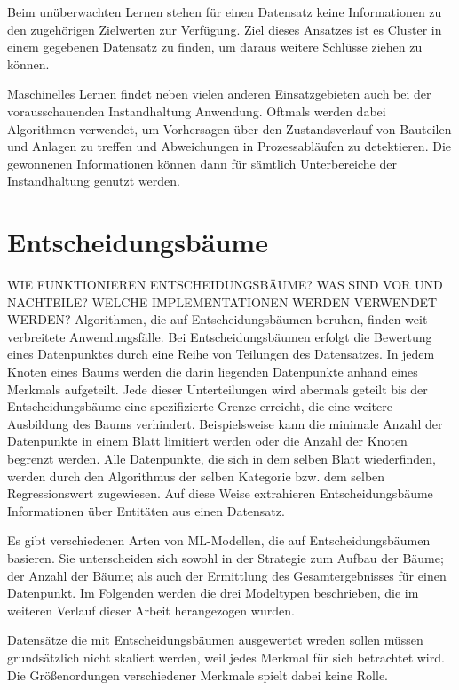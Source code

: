 Beim unüberwachten Lernen stehen für einen Datensatz keine Informationen zu den zugehörigen Zielwerten zur Verfügung. Ziel dieses Ansatzes ist es Cluster in einem gegebenen Datensatz zu finden, um daraus weitere Schlüsse ziehen zu können.


Maschinelles Lernen findet neben vielen anderen Einsatzgebieten auch bei der vorausschauenden Instandhaltung Anwendung. Oftmals werden dabei Algorithmen verwendet, um Vorhersagen über den Zustandsverlauf von Bauteilen und Anlagen zu treffen und Abweichungen in Prozessabläufen zu detektieren. Die gewonnenen Informationen können dann für sämtlich Unterbereiche der Instandhaltung genutzt werden.

\section{Entscheidungsbäume}
\label{sec:entscheidungsbaeume}
WIE FUNKTIONIEREN ENTSCHEIDUNGSBÄUME? WAS SIND VOR UND NACHTEILE? WELCHE IMPLEMENTATIONEN WERDEN VERWENDET WERDEN? 
Algorithmen, die auf Entscheidungsbäumen beruhen, finden weit verbreitete Anwendungsfälle. Bei Entscheidungsbäumen erfolgt die Bewertung eines Datenpunktes durch eine Reihe von Teilungen des Datensatzes. In jedem Knoten eines Baums werden die darin liegenden Datenpunkte anhand eines Merkmals aufgeteilt. Jede dieser Unterteilungen wird abermals geteilt bis der Entscheidungsbäume eine spezifizierte Grenze erreicht, die eine weitere Ausbildung des Baums verhindert. Beispielsweise kann die minimale Anzahl der Datenpunkte in einem Blatt limitiert werden oder die Anzahl der Knoten begrenzt werden. Alle Datenpunkte, die sich in dem selben Blatt wiederfinden, werden durch den Algorithmus der selben Kategorie bzw. dem selben Regressionswert zugewiesen.  Auf diese Weise extrahieren Entscheidungsbäume Informationen über Entitäten aus einen Datensatz.

Es gibt verschiedenen Arten von ML-Modellen, die auf Entscheidungsbäumen basieren. Sie unterscheiden sich sowohl in der Strategie zum Aufbau der Bäume; der Anzahl der Bäume; als auch der Ermittlung des Gesamtergebnisses für einen Datenpunkt. Im Folgenden werden die drei Modeltypen beschrieben, die im weiteren Verlauf dieser Arbeit herangezogen wurden.

Datensätze die mit Entscheidungsbäumen ausgewertet wreden sollen müssen grundsätzlich nicht skaliert werden, weil jedes Merkmal für sich betrachtet wird. Die Größenordungen verschiedener Merkmale spielt dabei keine Rolle.

